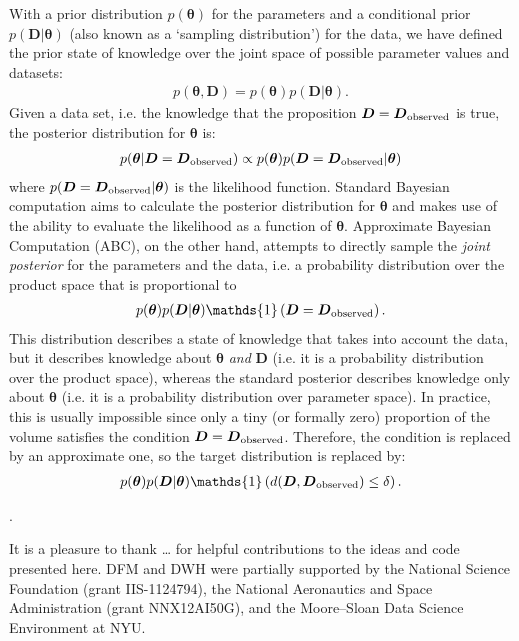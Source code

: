 \documentclass[12pt,preprint]{aastex}
\newcommand{\params}{\boldsymbol{\theta}}
\newcommand{\data}{\boldsymbol{D}}
\begin{document}
With a prior distribution $p(\params)$ for the parameters
and a conditional prior $p(\data|\params)$ (also known as a `sampling
distribution') for the data, we have defined the prior state of knowledge
over the joint space of possible parameter values and datasets:
\begin{eqnarray}
p(\params, \data) = p(\params)p(\data | \params).
\end{eqnarray}
Given a data set, i.e. the knowledge that the
proposition $\data = \data_{\rm observed}$ is true, the
posterior distribution for $\params$ is:
\begin{eqnarray}
p(\params | \data = \data_{\rm observed}) \propto
p(\params)p(\data = \data_{\rm observed} | \params)
\end{eqnarray}
where $p(\data = \data_{\rm observed} | \params)$ is the likelihood function.
Standard Bayesian computation aims to calculate the posterior distribution
for $\params$ and makes use of the ability to evaluate the likelihood
as a function of $\params$. Approximate Bayesian Computation (ABC), on the
other hand, attempts to directly sample the {\it joint posterior} for the
parameters and the data, i.e. a probability distribution over the product
space that is proportional to
\begin{eqnarray}
p(\params)p(\data | \params)
\mathds{1}\left(\data = \data_{\rm observed}\right).
\end{eqnarray}
This distribution describes a state of knowledge that takes into account the
data, but it describes knowledge about $\params$ {\it and} $\data$ (i.e. it
is a probability distribution over the product space), whereas the standard
posterior describes knowledge only about $\params$ (i.e. it is a probability
distribution over parameter space).
In practice, this is usually impossible since only a tiny (or formally zero)
proportion of the volume satisfies the condition
$\data = \data_{\rm observed}$. Therefore, the condition is replaced by
an approximate one, so the target distribution is replaced by:
\begin{eqnarray}
p(\params)p(\data | \params)
\mathds{1}\left(d(\data, \data_{\rm observed}) \leq \delta\right).
\end{eqnarray}




\citep{Ballard:2014}.

\acknowledgments
It is a pleasure to thank
\ldots
for helpful contributions to the ideas and code presented here.
DFM and DWH were partially supported by the National Science Foundation
(grant IIS-1124794),
the National Aeronautics and Space Administration
(grant NNX12AI50G), and the Moore--Sloan Data Science Environment at NYU.
\end{document}
